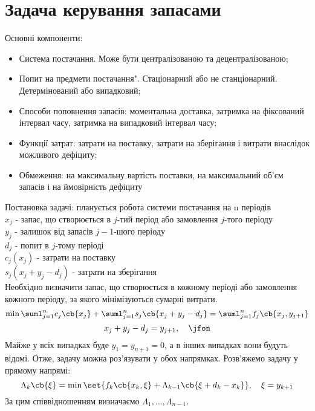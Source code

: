 \section{Задача керування запасами}
Основні компоненти:
\begin{itemize}
	\item Система постачання. Може бути централізованою та децентралізованою;
	\item Попит на предмети постачання". Стаціонарний або не станціонарний. Детермінований або випадковий;
	\item Способи поповнення запасів: моментальна доставка, затримка на фіксований інтервал часу, затримка на випадковий інтервал часу;
	\item Функції затрат: затрати на поставку, затрати на зберігання і витрати внаслідок можливого дефіциту;
	\item Обмеження: на максимальну вартість поставки, на максимальний об’єм запасів і на ймовірність дефіциту
\end{itemize}
Постановка задачі: планується робота системи постачання на n періодів\\
$x_j$ - запас, що створюється в $j$-тий період або замовлення $j$-того періоду\\
$y_j$ - залишок від запасів $j-1$-шого періоду\\
$d_j$ - попит в $j$-тому періоді\\
$c_j(x_j)$ - затрати на поставку\\
$s_j(x_j+y_j-d_j)$ - затрати на зберігання\\
Необхідно визначити запас, що створюється в кожному періоді або замовлення кожного періоду, за якого мінімізуються сумарні витрати.
\begin{equation}
	\min\suml_{j=1}^n c_j\cb{x_j} + \suml_{j=1}^n s_j\cb{x_j+y_j-d_j} = \suml_{j=1}^n f_j\cb{x_j,y_{j+1}}
\end{equation}
\begin{equation}\label{tr:10:6}
	x_j + y_j -d_j = y_{j+1},\quad \jfon
\end{equation}
Майже у всіх випадках буде $y_1=y_{n+1} = 0$, а в інших випадках вони будуть відомі. Отже, задачу можна роз’язувати у обох напрямках. Розв’яжемо задачу у прямому напрямі:
\begin{equation}\label{tr:10:7}
	\Lambda_k\cb{\xi} = \min\set{ f_k\cb{x_k,\xi} +\Lambda_{k-1}\cb{\xi+d_k-x_k}},\quad\xi = y_{k+1}
\end{equation}
За цим співвідношенням визначаємо $\Lambda_{1},\ldots,\Lambda_{n-1}$.\\
